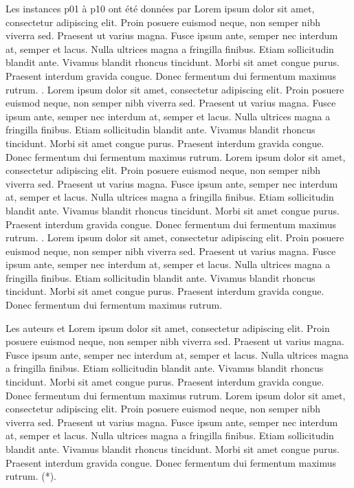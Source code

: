 \medskip

Les instances p01 à p10 ont été données par \parencite{eilon_distribution_1971} Lorem ipsum dolor sit amet, consectetur adipiscing elit. Proin posuere euismod neque, non semper nibh viverra sed. Praesent ut varius magna. Fusce ipsum ante, semper nec interdum at, semper et lacus. Nulla ultrices magna a fringilla finibus. Etiam sollicitudin blandit ante. Vivamus blandit rhoncus tincidunt. Morbi sit amet congue purus. Praesent interdum gravida congue. Donec fermentum dui fermentum maximus rutrum. \parencite{christofides_period_1984}. Lorem ipsum dolor sit amet, consectetur adipiscing elit. Proin posuere euismod neque, non semper nibh viverra sed. Praesent ut varius magna. Fusce ipsum ante, semper nec interdum at, semper et lacus. Nulla ultrices magna a fringilla finibus. Etiam sollicitudin blandit ante. Vivamus blandit rhoncus tincidunt. Morbi sit amet congue purus. Praesent interdum gravida congue. Donec fermentum dui fermentum maximus rutrum. \parencite{chao_new_1995} Lorem ipsum dolor sit amet, consectetur adipiscing elit. Proin posuere euismod neque, non semper nibh viverra sed. Praesent ut varius magna. Fusce ipsum ante, semper nec interdum at, semper et lacus. Nulla ultrices magna a fringilla finibus. Etiam sollicitudin blandit ante. Vivamus blandit rhoncus tincidunt. Morbi sit amet congue purus. Praesent interdum gravida congue. Donec fermentum dui fermentum maximus rutrum. \parencite{cordeau_tabu_1997}. Lorem ipsum dolor sit amet, consectetur adipiscing elit. Proin posuere euismod neque, non semper nibh viverra sed. Praesent ut varius magna. Fusce ipsum ante, semper nec interdum at, semper et lacus. Nulla ultrices magna a fringilla finibus. Etiam sollicitudin blandit ante. Vivamus blandit rhoncus tincidunt. Morbi sit amet congue purus. Praesent interdum gravida congue. Donec fermentum dui fermentum maximus rutrum.

\medskip

Les auteurs \parencite{liu_hybridization_2014} et \parencite{cacchiani_set-covering_2014} Lorem ipsum dolor sit amet, consectetur adipiscing elit. Proin posuere euismod neque, non semper nibh viverra sed. Praesent ut varius magna. Fusce ipsum ante, semper nec interdum at, semper et lacus. Nulla ultrices magna a fringilla finibus. Etiam sollicitudin blandit ante. Vivamus blandit rhoncus tincidunt. Morbi sit amet congue purus. Praesent interdum gravida congue. Donec fermentum dui fermentum maximus rutrum. \parencite{chao_new_1995} Lorem ipsum dolor sit amet, consectetur adipiscing elit. Proin posuere euismod neque, non semper nibh viverra sed. Praesent ut varius magna. Fusce ipsum ante, semper nec interdum at, semper et lacus. Nulla ultrices magna a fringilla finibus. Etiam sollicitudin blandit ante. Vivamus blandit rhoncus tincidunt. Morbi sit amet congue purus. Praesent interdum gravida congue. Donec fermentum dui fermentum maximus rutrum. (*). 

